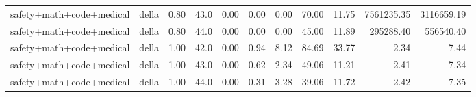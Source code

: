 \begin{table}[H]
{\begin{tabular}{llllrrrrrrr}
safety+math+code+medical & della & 0.80 & 43.0 & 0.00 & 0.00 & 0.00 & 70.00 & 11.75 & 7561235.35 & 3116659.19 \\
safety+math+code+medical & della & 0.80 & 44.0 & 0.00 & 0.00 & 0.00 & 45.00 & 11.89 & 295288.40 & 556540.40 \\
safety+math+code+medical & della & 1.00 & 42.0 & 0.00 & 0.94 & 8.12 & 84.69 & 33.77 & 2.34 & 7.44 \\
safety+math+code+medical & della & 1.00 & 43.0 & 0.00 & 0.62 & 2.34 & 49.06 & 11.21 & 2.41 & 7.34 \\
safety+math+code+medical & della & 1.00 & 44.0 & 0.00 & 0.31 & 3.28 & 39.06 & 11.72 & 2.42 & 7.35 \\
\bottomrule
\end{tabular}
}
\end{table}